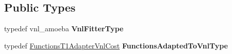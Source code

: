 \subsection*{Public Types}
\begin{DoxyCompactItemize}
\item 
\hypertarget{class_ox_1_1_fitter_amoeba_vnl_a1e111bef9b9c7b8cda195729f0eafe7c}{typedef vnl\-\_\-amoeba {\bfseries Vnl\-Fitter\-Type}}\label{class_ox_1_1_fitter_amoeba_vnl_a1e111bef9b9c7b8cda195729f0eafe7c}

\item 
\hypertarget{class_ox_1_1_fitter_amoeba_vnl_a7525477163c41620aa3666dcd68bcc2f}{typedef \hyperlink{class_ox_1_1_functions_t1_adapter_vnl_cost}{Functions\-T1\-Adapter\-Vnl\-Cost} {\bfseries Functions\-Adapted\-To\-Vnl\-Type}}\label{class_ox_1_1_fitter_amoeba_vnl_a7525477163c41620aa3666dcd68bcc2f}

\end{DoxyCompactItemize}
